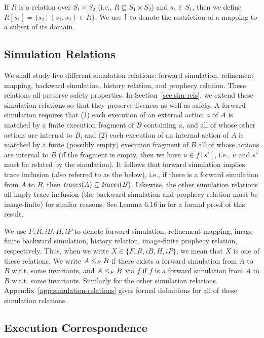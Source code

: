 \documentclass[11pt]{article}
\newcommand{\up}{\raisebox{0.2ex}{$\upharpoonright$}}
\newcommand{\traces}{\mathit{traces}}
\begin{document}
If $R$ is a relation over $S_1 \times S_2$ (i.e., $R \subseteq S_1
\times S_2$) and $s_1 \in S_1$, then we define
$R[s_1] = \{ s_2 ~|~ (s_1,s_2) \in R\}$.
We use $\up$ to denote the restriction of a mapping to a subset of its domain.



\subsection{Simulation Relations}
\label{sec:simulation-relations}

We shall study five different simulation relations: 
forward simulation, refinement mapping, backward simulation,
history relation, and prophecy relation.
These relations all preserve safety properties.
In Section~\ref{sec:sim-rels}, we extend these simulation relations so
that they preserve liveness as well as safety.
A forward simulation requires that (1) each execution of
an external action $a$ of $A$ is matched by a finite execution
fragment of $B$ containing $a$, and all of whose other actions are
internal to $B$, and (2) each execution of an internal action of $A$
is matched by a finite (possibly empty) execution fragment of $B$ all
of whose actions are internal to $B$ (if the fragment
is empty, then we have $u \in f[s']$, i.e., $u$ and $s'$ must be related by
the simulation).
It follows that forward simulation implies trace inclusion
(also referred to as the  below), i.e., 
if there is a forward simulation from $A$ to $B$, then
$\traces(A) \sub \traces(B)$.
Likewise, the other simulation relations all imply trace inclusion (the backward
simulation and prophecy relation must be image-finite) for similar reasons.
See Lemma 6.16 in \cite{GSSL93} for a formal proof of this result.

We use $F, R, iB, H, iP$ to denote forward simulation, refinement
mapping, image-finite backward simulation, history relation,
image-finite prophecy relation, respectively. 
Thus, when we write $X \in \{F, R, iB, H, iP\}$, we mean that $X$ is
one of these relations.
We write $A \leq_F B$ if there exists a forward simulation from $A$
to $B$ w.r.t. some invariants, and 
$A \leq_F B$ via $f$ if $f$ is a forward simulation from
$A$ to $B$ w.r.t. some invariants. Similarly for the other simulation relations.
Appendix~\ref{app:simulation-relations} gives formal definitions for
all of these simulation relations. 





\subsection{Execution Correspondence}
\end{document}
